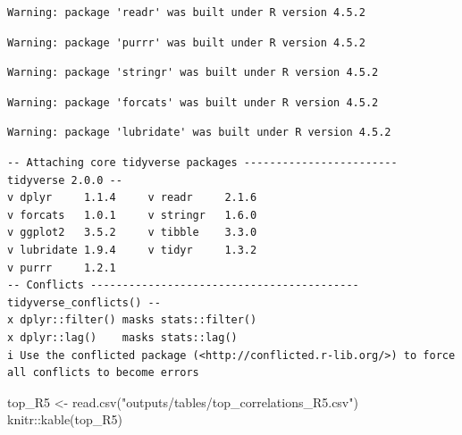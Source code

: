 \documentclass[
  letterpaper,
  DIV=11,
  numbers=noendperiod]{scrartcl}
\newenvironment{Shaded}{\begin{snugshade}}{\end{snugshade}}
\newcommand{\FunctionTok}[1]{\textcolor[rgb]{0.28,0.35,0.67}{#1}}
\newcommand{\NormalTok}[1]{\textcolor[rgb]{0.00,0.23,0.31}{#1}}
\newcommand{\OtherTok}[1]{\textcolor[rgb]{0.00,0.23,0.31}{#1}}
\newcommand{\SpecialCharTok}[1]{\textcolor[rgb]{0.37,0.37,0.37}{#1}}
\newcommand{\StringTok}[1]{\textcolor[rgb]{0.13,0.47,0.30}{#1}}
\begin{document}
\begin{verbatim}
Warning: package 'readr' was built under R version 4.5.2
\end{verbatim}

\begin{verbatim}
Warning: package 'purrr' was built under R version 4.5.2
\end{verbatim}

\begin{verbatim}
Warning: package 'stringr' was built under R version 4.5.2
\end{verbatim}

\begin{verbatim}
Warning: package 'forcats' was built under R version 4.5.2
\end{verbatim}

\begin{verbatim}
Warning: package 'lubridate' was built under R version 4.5.2
\end{verbatim}

\begin{verbatim}
-- Attaching core tidyverse packages ------------------------ tidyverse 2.0.0 --
v dplyr     1.1.4     v readr     2.1.6
v forcats   1.0.1     v stringr   1.6.0
v ggplot2   3.5.2     v tibble    3.3.0
v lubridate 1.9.4     v tidyr     1.3.2
v purrr     1.2.1     
-- Conflicts ------------------------------------------ tidyverse_conflicts() --
x dplyr::filter() masks stats::filter()
x dplyr::lag()    masks stats::lag()
i Use the conflicted package (<http://conflicted.r-lib.org/>) to force all conflicts to become errors
\end{verbatim}

\begin{Shaded}
\begin{Highlighting}[]
\NormalTok{top\_R5 }\OtherTok{\textless{}{-}} \FunctionTok{read.csv}\NormalTok{(}\StringTok{"outputs/tables/top\_correlations\_R5.csv"}\NormalTok{)}
\NormalTok{knitr}\SpecialCharTok{::}\FunctionTok{kable}\NormalTok{(top\_R5)}
\end{Highlighting}
\end{Shaded}
\end{document}
